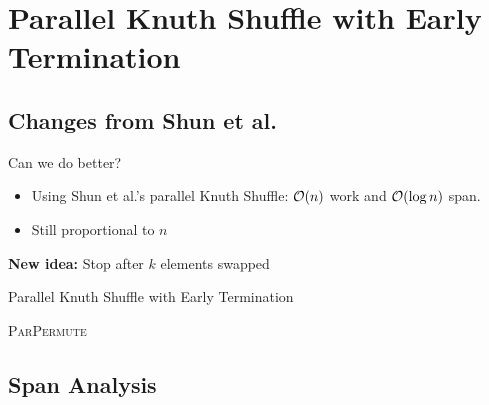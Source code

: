 \section{Parallel Knuth Shuffle with Early Termination}

\subsection{Changes from Shun et al.}

\begin{frame}{Can we do better?}
  \begin{itemize}
    \item Using Shun et al.'s parallel Knuth Shuffle: \(\mathcal{O}(n)\) work and \(\mathcal{O}(\log n)\) span.
    \item Still proportional to \(n\)
  \end{itemize}
  \vspace{2em}
  \begin{center}
    \textbf{New idea:} Stop after \(k\) elements swapped
  \end{center}
\end{frame}

\begin{frame}{Parallel Knuth Shuffle with Early Termination}
  \begin{algorithm}[H]
    \caption{\textsc{ParPermute}}
    \begin{algorithmic}

       
        \EndParFor
        \EndParFor
      \EndWhile
    \end{algorithmic}
  \end{algorithm}
\end{frame}

\subsection{Span Analysis}

